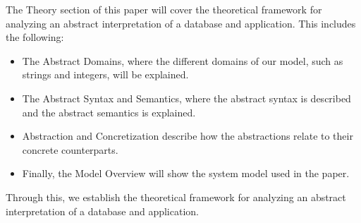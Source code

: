 The Theory section of this paper will cover the theoretical framework for analyzing an abstract interpretation of a database and application.
This includes the following:

\begin{itemize}
    \item The Abstract Domains, where the different domains of our model, such as strings and integers, will be explained.
    \item The Abstract Syntax and Semantics, where the abstract syntax is described and the abstract semantics is explained.
    \item Abstraction and Concretization describe how the abstractions relate to their concrete counterparts.
    \item Finally, the Model Overview will show the system model used in the paper.
\end{itemize}

Through this, we establish the theoretical framework for analyzing an abstract interpretation of a database and application.
